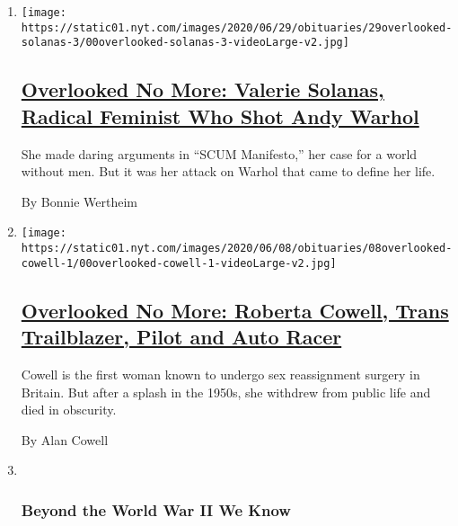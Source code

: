 \begin{enumerate}
\def\labelenumi{\arabic{enumi}.}
\item
  \texttt{[image: https://static01.nyt.com/images/2020/06/29/obituaries/29overlooked-solanas-3/00overlooked-solanas-3-videoLarge-v2.jpg]}

  \hypertarget{overlooked-no-more-valerie-solanas-radical-feminist-who-shot-andy-warhol}{%
  \subsection{\texorpdfstring{\href{/2020/06/26/obituaries/valerie-solanas-overlooked.html}{Overlooked
  No More: Valerie Solanas, Radical Feminist Who Shot Andy
  Warhol}}{Overlooked No More: Valerie Solanas, Radical Feminist Who Shot Andy Warhol}}\label{overlooked-no-more-valerie-solanas-radical-feminist-who-shot-andy-warhol}}

  She made daring arguments in ``SCUM Manifesto,'' her case for a world
  without men. But it was her attack on Warhol that came to define her
  life.

  By Bonnie Wertheim
\item
  \texttt{[image: https://static01.nyt.com/images/2020/06/08/obituaries/08overlooked-cowell-1/00overlooked-cowell-1-videoLarge-v2.jpg]}

  \hypertarget{overlooked-no-more-roberta-cowell-trans-trailblazer-pilot-and-auto-racer}{%
  \subsection{\texorpdfstring{\href{/2020/06/05/obituaries/roberta-cowell-overlooked.html}{Overlooked
  No More: Roberta Cowell, Trans Trailblazer, Pilot and Auto
  Racer}}{Overlooked No More: Roberta Cowell, Trans Trailblazer, Pilot and Auto Racer}}\label{overlooked-no-more-roberta-cowell-trans-trailblazer-pilot-and-auto-racer}}

  Cowell is the first woman known to undergo sex reassignment surgery in
  Britain. But after a splash in the 1950s, she withdrew from public
  life and died in obscurity.

  By Alan Cowell
\item ~
  \hypertarget{beyond-the-world-war-ii-we-know}{%
  \subsubsection{Beyond the World War II We
  Know}\label{beyond-the-world-war-ii-we-know}}


\end{enumerate}
